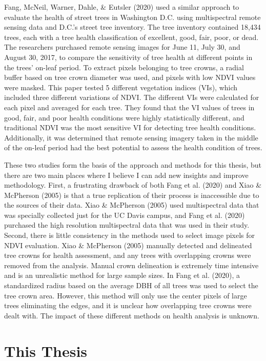 \documentclass[12pt,twoside]{reedthesis}
\begin{document}
Fang, McNeil, Warner, Dahle, \& Eutsler (2020) used a similar approach to evaluate the health of street trees in Washington D.C. using multispectral remote sensing data and D.C.'s street tree inventory. The tree inventory contained 18,434 trees, each with a tree health classification of excellent, good, fair, poor, or dead. The researchers purchased remote sensing images for June 11, July 30, and August 30, 2017, to compare the sensitivity of tree health at different points in the trees' on-leaf period. To extract pixels belonging to tree crowns, a radial buffer based on tree crown diameter was used, and pixels with low NDVI values were masked. This paper tested 5 different vegetation indices (VIs), which included three different variations of NDVI. The different VIs were calculated for each pixel and averaged for each tree. They found that the VI values of trees in good, fair, and poor health conditions were highly statistically different, and traditional NDVI was the most sensitive VI for detecting tree health conditions. Additionally, it was determined that remote sensing imagery taken in the middle of the on-leaf period had the best potential to assess the health condition of trees.

These two studies form the basis of the approach and methods for this thesis, but there are two main places where I believe I can add new insights and improve methodology. First, a frustrating drawback of both Fang et al. (2020) and Xiao \& McPherson (2005) is that a true replication of their process is inaccessible due to the sources of their data. Xiao \& McPherson (2005) used multispectral data that was specially collected just for the UC Davis campus, and Fang et al. (2020) purchased the high resolution multispectral data that was used in their study. Second, there is little consistency in the methods used to select image pixels for NDVI evaluation. Xiao \& McPherson (2005) manually detected and delineated tree crowns for health assessment, and any trees with overlapping crowns were removed from the analysis. Manual crown delineation is extremely time intensive and is an unrealistic method for large sample sizes. In Fang et al. (2020), a standardized radius based on the average DBH of all trees was used to select the tree crown area. However, this method will only use the center pixels of large trees eliminating the edges, and it is unclear how overlapping tree crowns were dealt with. The impact of these different methods on health analysis is unknown.

\hypertarget{this-thesis}{%
\section{This Thesis}\label{this-thesis}}
\end{document}
